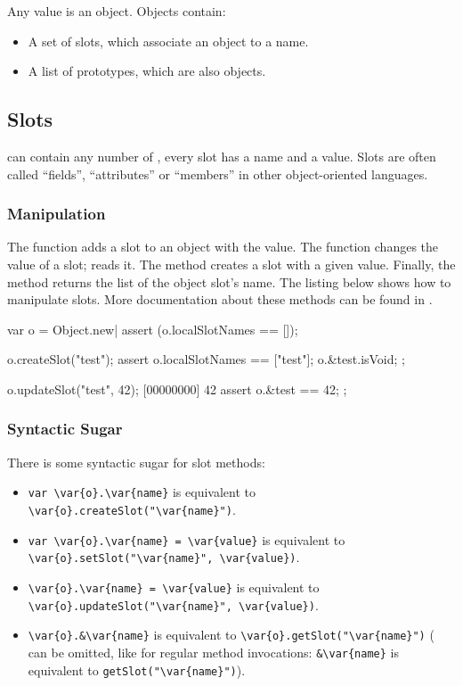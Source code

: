 Any \us value is an object. Objects contain:

\begin{itemize}
\item A set of slots, which associate an object to a name.
\item A list of prototypes, which are also objects.
\end{itemize}

\subsection{Slots}

 can contain any number of , every slot has a name
and a value. Slots are often called ``fields'', ``attributes'' or
``members'' in other object-oriented languages.

\subsubsection{Manipulation}

The  function adds a slot to an object with the
 value. The  function changes
the value of a slot;  reads it. The
 method creates a slot with a given value. Finally,
the  method returns the list of the object
slot's name. The listing below shows how to manipulate slots. More
documentation about these methods can be found in .

\begin{urbiscript}
var o = Object.new|
assert (o.localSlotNames == []);

o.createSlot("test");
assert
{
  o.localSlotNames == ["test"];
  o.&test.isVoid;
};

o.updateSlot("test", 42);
[00000000] 42
assert
{
  o.&test == 42;
};
\end{urbiscript}

\subsubsection{Syntactic Sugar}

There is some syntactic sugar for slot methods:
\begin{itemize}
\item \lstinline|var \var{o}.\var{name}| is equivalent to
  \lstinline[style=varInString]|\var{o}.createSlot("\var{name}")|.
\item \lstinline|var \var{o}.\var{name} = \var{value}| is equivalent to
  \lstinline[style=varInString]|\var{o}.setSlot("\var{name}", \var{value})|.
\item \lstinline|\var{o}.\var{name} = \var{value}| is equivalent to
  \lstinline[style=varInString]|\var{o}.updateSlot("\var{name}", \var{value})|.
\item \lstinline|\var{o}.&\var{name}| is equivalent to
  \lstinline[style=varInString]|\var{o}.getSlot("\var{name}")| ( can
  be omitted, like for regular method invocations: \lstinline|&\var{name}|
  is equivalent to \lstinline[style=varInString]|getSlot("\var{name}")|).
\end{itemize}


